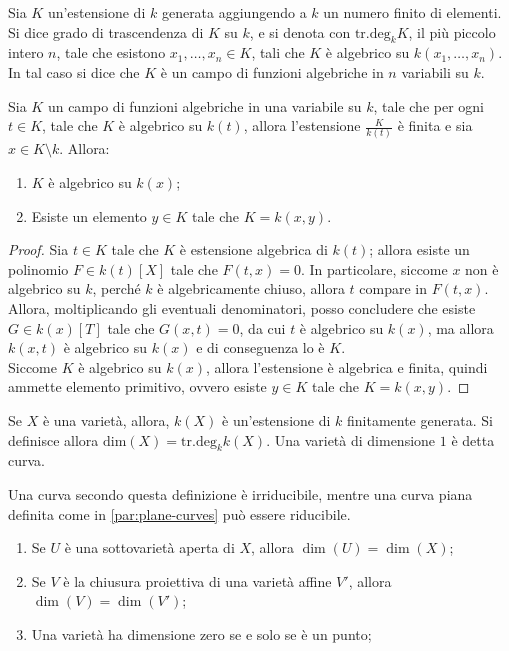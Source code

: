     \begin{definizione}
        Sia $K$ un'estensione di $k$ generata aggiungendo a $k$ un numero finito di elementi. Si dice grado di trascendenza di $K$ su $k$, e si denota con $\text{tr.deg}_kK$, il più piccolo intero $n$, tale che esistono 
        $x_1,\ldots,x_n \in K$, tali che $K$ è algebrico su $k(x_1,\ldots,x_n)$. In tal caso si dice che $K$ è un campo di funzioni algebriche in $n$ variabili su $k$.
    \end{definizione}
    \begin{proposizione} \label{prop:fun-fields}
        Sia $K$ un campo di funzioni algebriche in una variabile su $k$, tale che per ogni $t \in K$, tale che $K$ è algebrico su $k(t)$, allora l'estensione $\frac{K}{k(t)}$ è finita e sia $x \in K \setminus k$. Allora: \begin{enumerate}
            \item $K$ è algebrico su $k(x)$;
            \item Esiste un elemento $y \in K$ tale che $K = k(x,y)$.
        \end{enumerate}
    \end{proposizione}
    \begin{proof}
        Sia $t \in K$ tale che $K$ è estensione algebrica di $k(t)$; allora esiste un polinomio $F \in k(t)[X]$ tale che $F(t,x) = 0$. In particolare, siccome $x$ non è algebrico su $k$, perché $k$ è algebricamente chiuso, allora $t$ compare 
        in $F(t,x)$. Allora, moltiplicando gli eventuali denominatori, posso concludere che esiste $G \in k(x)[T]$ tale che $G(x,t) = 0$, da cui $t$ è algebrico su $k(x)$, ma allora $k(x,t)$ è algebrico su $k(x)$ e di conseguenza lo è $K$. \\
        Siccome $K$ è algebrico su $k(x)$, allora l'estensione è algebrica e finita, quindi ammette elemento primitivo, ovvero esiste $y \in K$ tale che $K = k(x,y)$.
    \end{proof}
    Se $X$ è una varietà, allora, $k(X)$ è un'estensione di $k$ finitamente generata. Si definisce allora $\text{dim}(X) = \text{tr.deg}_kk(X)$. Una varietà di dimensione $1$ è detta curva.
    \begin{osservazione}
        Una curva secondo questa definizione è irriducibile, mentre una curva piana definita come in \ref{par:plane-curves} può essere riducibile.
    \end{osservazione}
    \begin{proposizione}
        \begin{enumerate}
            \item Se $U$ è una sottovarietà aperta di $X$, allora $\dim(U) = \dim(X)$;
            \item Se $V$ è la chiusura proiettiva di una varietà affine $V'$, allora $\dim(V) = \dim(V')$;
            \item Una varietà ha dimensione zero se e solo se è un punto;
        \end{enumerate}
    \end{proposizione}

